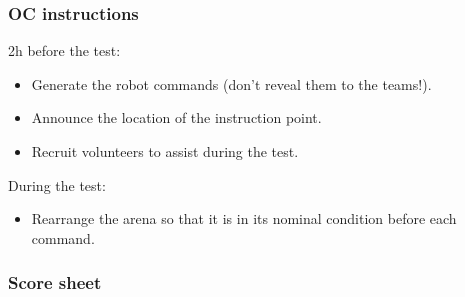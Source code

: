 \subsubsection*{OC instructions}

2h before the test:
\begin{itemize}
	\item Generate the robot commands (don't reveal them to the teams!).
	\item Announce the location of the instruction point.
	\item Recruit volunteers to assist during the test.
\end{itemize}

\noindent During the test:
\begin{itemize}[nosep]
	\item Rearrange the arena so that it is in its nominal condition before each command.
\end{itemize}

\subsubsection*{Score sheet}


